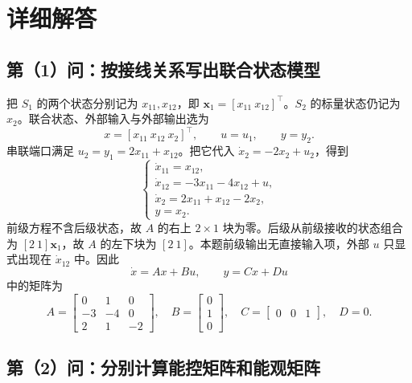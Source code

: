 
\section{详细解答}

\subsection{第（1）问：按接线关系写出联合状态模型}

把 $S_1$ 的两个状态分别记为 $x_{11},x_{12}$，即 $\boldsymbol{x}_1=[x_{11}\ x_{12}]^\top$。$S_2$ 的标量状态仍记为 $x_2$。联合状态、外部输入与外部输出选为
\[
    x=[x_{11}\ x_{12}\ x_2]^\top,\qquad u=u_1,\qquad y=y_2 .
\]
串联端口满足 $u_2=y_1=2x_{11}+x_{12}$。把它代入 $\dot x_2=-2x_2+u_2$，得到
\[
\begin{cases}
    \dot x_{11}=x_{12},\\
    \dot x_{12}=-3x_{11}-4x_{12}+u,\\
    \dot x_2=2x_{11}+x_{12}-2x_2,\\
    y=x_2 .
\end{cases}
\]
前级方程不含后级状态，故 $A$ 的右上 $2\times1$ 块为零。后级从前级接收的状态组合为 $[2\ 1]\boldsymbol x_1$，故 $A$ 的左下块为 $[2\ 1]$。本题前级输出无直接输入项，外部 $u$ 只显式出现在 $\dot x_{12}$ 中。因此
\[
    \boxed{\dot x=Ax+Bu,\qquad y=Cx+Du}
\]
中的矩阵为
\[
    A=\begin{bmatrix}0&1&0\\-3&-4&0\\2&1&-2\end{bmatrix},
    \quad B=\begin{bmatrix}0\\1\\0\end{bmatrix},
    \quad C=\begin{bmatrix}0&0&1\end{bmatrix},
    \quad D=0 .
\]

\subsection{第（2）问：分别计算能控矩阵和能观矩阵}

